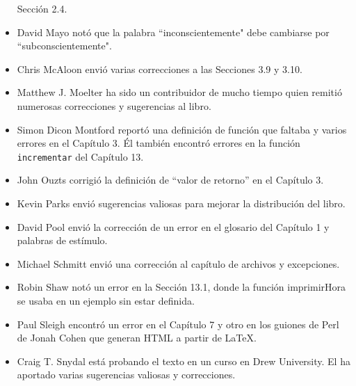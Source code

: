 \begin{itemize}
	Sección 2.4.  
	\item David Mayo notó que la palabra ``inconscientemente"
	debe cambiarse por  ``subconscientemente".
	\item Chris McAloon envió varias correcciones a las Secciones 3.9 y 3.10.
	\item Matthew J. Moelter ha sido un contribuidor de mucho tiempo quien 
	remitió 
	numerosas correcciones y sugerencias al libro.  
	\item Simon Dicon Montford reportó una definición de función que faltaba y 
	varios errores en el Capítulo 3.  Él también encontró errores en la
	función \texttt{incrementar} del Capítulo 13.
	\item John Ouzts corrigió la definición de ``valor de retorno'' en el
	Capítulo 3.
	\item Kevin Parks envió  sugerencias valiosas para mejorar la distribución 
	del libro.
	\item David Pool envió la corrección de un error en el glosario del 
	Capítulo 1 y palabras de estímulo.
	\item Michael Schmitt envió una corrección al capítulo de archivos y 
	excepciones.
	\item Robin Shaw notó un error en la Sección 13.1, donde la función
	imprimirHora se usaba en un ejemplo sin estar definida.
	\item Paul Sleigh encontró un error en el Capítulo 7 y otro en los
	guiones de Perl de Jonah Cohen que generan HTML a partir de LaTeX.
	\item Craig T. Snydal está probando el texto en un curso en  Drew
	University. El ha aportado varias sugerencias valiosas y correcciones.

\end{itemize}
